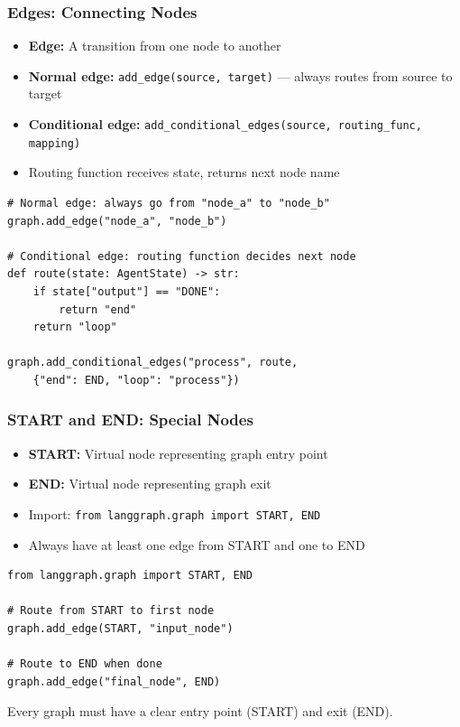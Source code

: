 \documentclass[aspectratio=169,11pt]{beamer}
\begin{document}
\begin{frame}[fragile]
\frametitle{Edges: Connecting Nodes}
\begin{itemize}
    \setlength{\itemsep}{1pt}
  \item \textbf{Edge:} A transition from one node to another
  \item \textbf{Normal edge:} \texttt{add\_edge(source, target)} — always routes from source to target
  \item \textbf{Conditional edge:} \texttt{add\_conditional\_edges(source, routing\_func, mapping)}
  \item Routing function receives state, returns next node name
\end{itemize}

\vspace{10pt}
\begin{lstlisting}
# Normal edge: always go from "node_a" to "node_b"
graph.add_edge("node_a", "node_b")

# Conditional edge: routing function decides next node
def route(state: AgentState) -> str:
    if state["output"] == "DONE":
        return "end"
    return "loop"

graph.add_conditional_edges("process", route,
    {"end": END, "loop": "process"})
\end{lstlisting}
\end{frame}

\begin{frame}[fragile]
\frametitle{START and END: Special Nodes}
\begin{itemize}
    \setlength{\itemsep}{1pt}
  \item \textbf{START:} Virtual node representing graph entry point
  \item \textbf{END:} Virtual node representing graph exit
  \item Import: \texttt{from langgraph.graph import START, END}
  \item Always have at least one edge from START and one to END
\end{itemize}

\vspace{10pt}
\begin{lstlisting}
from langgraph.graph import START, END

# Route from START to first node
graph.add_edge(START, "input_node")

# Route to END when done
graph.add_edge("final_node", END)
\end{lstlisting}

\vspace{15pt}
\begin{tipbox}
Every graph must have a clear entry point (START) and exit (END).
\end{tipbox}
\end{frame}
\end{document}
